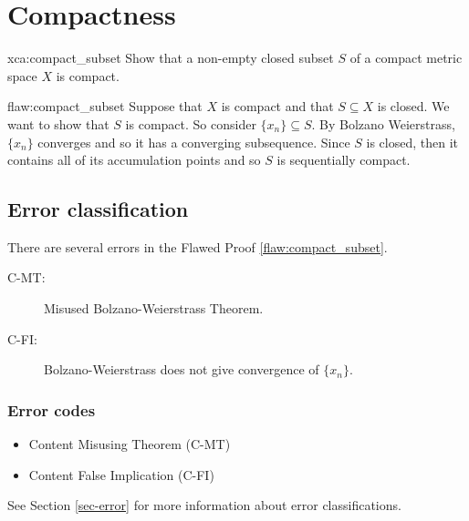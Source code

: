 \section{Compactness}

\begin{xca}{xca:compact_subset}
Show that a non-empty closed subset $S$ of a compact metric space $X$ is compact.
\end{xca}

\begin{flaw}{flaw:compact_subset} %
Suppose that $X$ is compact and that $S \subseteq X$ is closed. We want to show that $S$ is compact. So consider $\{x_n\} \subseteq S.$ By Bolzano Weierstrass, $\{x_n\}$ converges and so it has a converging subsequence. Since $S$ is closed, then it contains all of its accumulation points and so $S$ is sequentially compact.
\end{flaw}

\clearpage
\subsection{Error classification}


There are several errors
 in the Flawed Proof \ref{flaw:compact_subset}. %


 \begin{description}
 	\item[C-MT:] Misused Bolzano-Weierstrass Theorem.
 	\item[C-FI:] Bolzano-Weierstrass does not give convergence of $\{x_n\}.$
 \end{description}


\subsubsection{Error codes}
\begin{itemize}
	\item 	Content Misusing Theorem (C-MT)
	\item   Content False Implication (C-FI)
\end{itemize}
See Section \ref{sec-error} for more information about error classifications.

